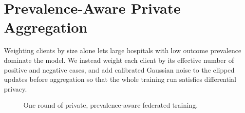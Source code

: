 \chapter{Prevalence-Aware Private Aggregation}
\label{ch:method}

Weighting clients by size alone lets large hospitals with low outcome prevalence dominate the
model. We instead weight each client by its effective number of positive and negative cases,
and add calibrated Gaussian noise to the clipped updates before aggregation so that the whole
training run satisfies differential privacy.

\begin{figure}[htbp]
  \centering
  \caption{One round of private, prevalence-aware federated training.}
  \label{fig:round}
\end{figure}
